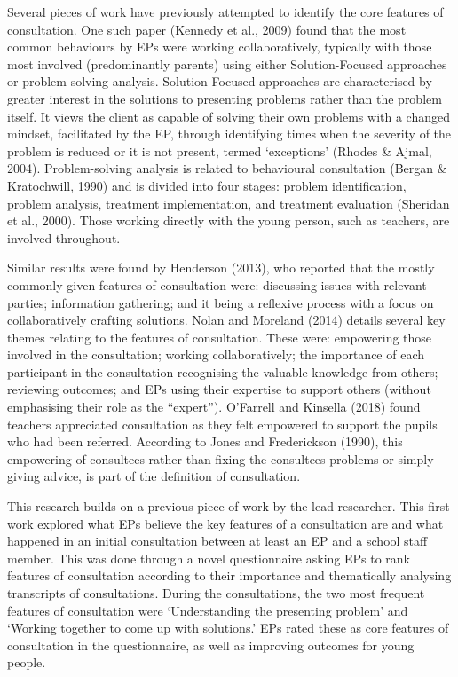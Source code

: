 \documentclass[
  english,
  man,floatsintext]{apa6}
\begin{document}
Several pieces of work have previously attempted to identify the core features of consultation. One such paper (Kennedy et al., 2009) found that the most common behaviours by EPs were working
collaboratively, typically with those most involved (predominantly
parents) using either Solution-Focused approaches or problem-solving
analysis. Solution-Focused approaches are characterised by greater
interest in the solutions to presenting problems rather than the problem
itself. It views the client as capable of solving their own problems
with a changed mindset, facilitated by the EP, through identifying times
when the severity of the problem is reduced or it is not present, termed
`exceptions' (Rhodes \& Ajmal, 2004). Problem-solving
analysis is related to behavioural consultation
(Bergan \& Kratochwill, 1990) and is divided into four
stages: problem identification, problem analysis, treatment
implementation, and treatment evaluation
(Sheridan et al., 2000). Those working directly with the young
person, such as teachers, are involved throughout.

Similar results were found by Henderson (2013), who reported that the
mostly commonly given features of consultation were: discussing issues
with relevant parties; information gathering; and it being a reflexive
process with a focus on collaboratively crafting solutions. Nolan and Moreland (2014) details several key themes relating to the features of consultation. These were: empowering those involved in
the consultation; working collaboratively; the importance of each
participant in the consultation recognising the valuable knowledge from
others; reviewing outcomes; and EPs using their expertise to support
others (without emphasising their role as the ``expert''). O'Farrell and Kinsella (2018) found teachers appreciated
consultation as they felt empowered to support the pupils who had been
referred. According to Jones and Frederickson (1990), this
empowering of consultees rather than fixing the consultees problems or
simply giving advice, is part of the definition of consultation.

This research builds on a previous piece of work by the lead researcher.
This first work explored what EPs believe the key features of a
consultation are and what happened in an initial consultation between at
least an EP and a school staff member. This was done through a novel
questionnaire asking EPs to rank features of consultation according to
their importance and thematically analysing transcripts of
consultations. During the consultations, the two most frequent features
of consultation were `Understanding the presenting problem' and `Working
together to come up with solutions.' EPs rated these as core features of
consultation in the questionnaire, as well as improving outcomes for
young people.
\end{document}
